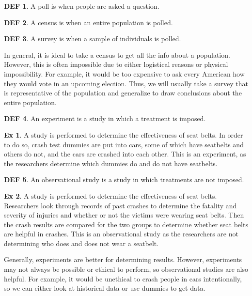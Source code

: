 \documentclass{article}
\theoremstyle{definition}\newtheorem{definition}{DEF}
\theoremstyle{definition}\newtheorem{example}{Ex}
\theoremstyle{lemma}\newtheorem{lemma}{Lemma}
\theoremstyle{corrolary}\newtheorem{corrolary}{Cor}
\begin{document}
\begin{definition}
A poll is when people are asked a question.
\end{definition}

\begin{definition}
A census is when an entire population is polled.
\end{definition}

\begin{definition}
A survey is when a sample of individuals is polled.
\end{definition}

In general, it is ideal to take a census to get all the info about a population.
However, this is often impossible due to either logistical reasons or physical impossibility.
For example, it would be too expensive to ask every American how they would vote in an upcoming election.
Thus, we will usually take a survey that is representative of the population and generalize to draw conclusions about the entire population.

\begin{definition}
An experiment is a study in which a treatment is imposed.
\end{definition}

\begin{example}
A study is performed to determine the effectiveness of seat belts.
In order to do so, crash test dummies are put into cars, some of which have seatbelts and others do not, and the cars are crashed into each other.
This is an experiment, as the researchers determine which dummies do and do not have seatbelts.
\end{example}

\begin{definition}
An observational study is a study in which treatments are not imposed.
\end{definition}

\begin{example}
A study is performed to determine the effectiveness of seat belts.
Researchers look through records of past crashes to determine the fatality and severity of injuries and whether or not the victims were wearing seat belts.
Then the crash results are compared for the two groups to determine whether seat belts are helpful in crashes.
This is an observational study as the researchers are not determining who does and does not wear a seatbelt.
\end{example}

Generally, experiments are better for determining results.
However, experiments may not always be possible or ethical to perform, so observational studies are also helpful.
For example, it would be unethical to crash people in cars intentionally, so we can either look at historical data or use dummies to get data.
\end{document}
